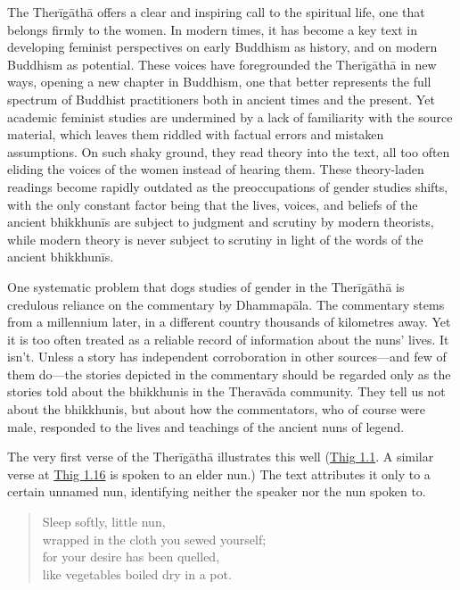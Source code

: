\documentclass[12pt,openany]{book}%
\begin{document}
The \textsanskrit{Therīgāthā} offers a clear and inspiring call to the spiritual life, one that belongs firmly to the women. In modern times, it has become a key text in developing feminist perspectives on early Buddhism as history, and on modern Buddhism as potential. These voices have foregrounded the \textsanskrit{Therīgāthā} in new ways, opening a new chapter in Buddhism, one that better represents the full spectrum of Buddhist practitioners both in ancient times and the present. Yet academic feminist studies are undermined by a lack of familiarity with the source material, which leaves them riddled with factual errors and mistaken assumptions. On such shaky ground, they read theory into the text, all too often eliding the voices of the women instead of hearing them. These theory-laden readings become rapidly outdated as the preoccupations of gender studies shifts, with the only constant factor being that the lives, voices, and beliefs of the ancient \textsanskrit{bhikkhunīs} are subject to judgment and scrutiny by modern theorists, while modern theory is never subject to scrutiny in light of the words of the ancient \textsanskrit{bhikkhunīs}.

One systematic problem that dogs studies of gender in the \textsanskrit{Therīgāthā} is credulous reliance on the commentary by \textsanskrit{Dhammapāla}. The commentary stems from a millennium later, in a different country thousands of kilometres away. Yet it is too often treated as a reliable record of information about the nuns’ lives. It isn’t. Unless a story has independent corroboration in other sources—and few of them do—the stories depicted in the commentary should be regarded only as the stories told about the bhikkhunis in the \textsanskrit{Theravāda} community. They tell us not about the bhikkhunis, but about how the commentators, who of course were male, responded to the lives and teachings of the ancient nuns of legend.

The very first verse of the \textsanskrit{Therīgāthā} illustrates this well (\href{https://suttacentral.net/thig1.1}{Thig 1.1}. A similar verse at \href{https://suttacentral.net/thig1.16}{Thig 1.16} is spoken to an elder nun.) The text attributes it only to a certain unnamed nun, identifying neither the speaker nor the nun spoken to.

\begin{quotation}%
Sleep softly, little nun, \\
wrapped in the cloth you sewed yourself; \\
for your desire has been quelled, \\
like vegetables boiled dry in a pot.

%
\end{quotation}
\end{document}
